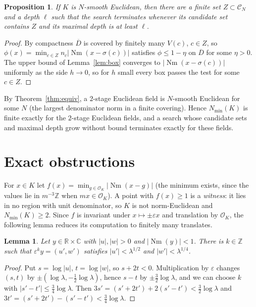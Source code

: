\documentclass[11pt]{amsart}
\newtheorem{proposition}[theorem]{Proposition}
\newtheorem{lemma}[theorem]{Lemma}
\theoremstyle{definition}
\theoremstyle{remark}
\numberwithin{equation}{section}
\newcommand{\Z}{\mathbb{Z}}
\newcommand{\R}{\mathbb{R}}
\newcommand{\C}{\mathbb{C}}
\newcommand{\cO}{\mathcal{O}}
\newcommand{\Nm}{\operatorname{Nm}}
\newcommand{\Nmin}{N_{\min}}
\begin{document}
\begin{proposition}\label{prop:terminate}
If $K$ is $N$-smooth Euclidean, then there are a finite set $Z\subset\mathcal C_N$ and a depth
$\ell$ such that the search terminates whenever its candidate set contains $Z$ and its maximal
depth is at least $\ell$.
\end{proposition}

\begin{proof}
By compactness $\overline D$ is covered by finitely many $V(c)$, $c\in Z$, so
$\phi(x)=\min_{c\in Z}n_c|\Nm(x-\sigma(c))|$ satisfies $\phi\le1-\eta$ on $\overline D$ for some
$\eta>0$. The upper bound of Lemma~\ref{lem:box} converges to $|\Nm(x-\sigma(c))|$ uniformly as
the side $h\to0$, so for $h$ small every box passes the test for some $c\in Z$.
\end{proof}

By Theorem~\ref{thm:equiv}, a $2$-stage Euclidean field is $N$-smooth Euclidean for some $N$
(the largest denominator norm in a finite covering). Hence $\Nmin(K)$ is finite exactly for
the $2$-stage Euclidean fields, and a search whose candidate sets and maximal depth grow without
bound terminates exactly for these fields.

\section{Exact obstructions}\label{sec:witness}

For $x\in K$ let $f(x)=\min_{g\in\cO_K}|\Nm(x-g)|$ (the minimum exists, since the values lie in
$m^{-3}\Z$ when $mx\in\cO_K$). A point with $f(x)\ge1$ is a \emph{witness}: it lies in no region
with unit denominator, so $K$ is not norm-Euclidean and $\Nmin(K)\ge2$. Since $f$ is invariant
under $x\mapsto\pm\varepsilon x$ and translation by $\cO_K$, the following lemma reduces its
computation to finitely many translates.

\begin{lemma}\label{lem:normalize}
Let $y\in\R\times\C$ with $|u|,|w|>0$ and $|\Nm(y)|<1$. There is $k\in\Z$ such that
$\varepsilon^ky=(u',w')$ satisfies $|u'|<\lambda^{1/2}$ and $|w'|<\lambda^{1/4}$.
\end{lemma}

\begin{proof}
Put $s=\log|u|$, $t=\log|w|$, so $s+2t<0$. Multiplication by $\varepsilon$ changes $(s,t)$ by
$\pm(\log\lambda,-\tfrac12\log\lambda)$, hence $s-t$ by $\pm\tfrac32\log\lambda$, and we can
choose $k$ with $|s'-t'|\le\tfrac34\log\lambda$. Then
$3s'=(s'+2t')+2(s'-t')<\tfrac32\log\lambda$ and $3t'=(s'+2t')-(s'-t')<\tfrac34\log\lambda$.
\end{proof}
\end{document}
